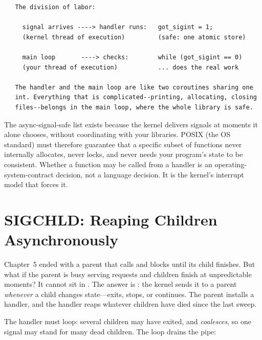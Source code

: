 \begin{verbatim}
   The division of labor:

     signal arrives ----> handler runs:   got_sigint = 1;
     (kernel thread of execution)         (safe: one atomic store)

     main loop       ----> checks:        while (got_sigint == 0)
     (your thread of execution)           ... does the real work

   The handler and the main loop are like two coroutines sharing one
   int. Everything that is complicated--printing, allocating, closing
   files--belongs in the main loop, where the whole library is safe.
\end{verbatim}

\begin{osconcept}
The async-signal-safe list exists because the kernel delivers signals
at moments it alone chooses, without coordinating with your libraries.
POSIX (the OS standard) must therefore guarantee that a specific subset
of functions never internally allocates, never locks, and never needs
your program's state to be consistent. Whether a function may be called
from a handler is an operating-system-contract decision, not a language
decision. It is the kernel's interrupt model that forces it.
\end{osconcept}

\section{SIGCHLD: Reaping Children Asynchronously}

Chapter~5 ended with a parent that calls  and blocks
until its child finishes. But what if the parent is busy serving
requests and children finish at unpredictable moments? It cannot sit in
. The answer is : the kernel sends it to a
parent \emph{whenever} a child changes state---exits, stops, or
continues. The parent installs a  handler, and the handler
reaps whatever children have died since the last sweep.

The handler must loop: several children may have exited, and
 \emph{coalesces}, so one signal may stand for many dead
children. The loop drains the pipe:

